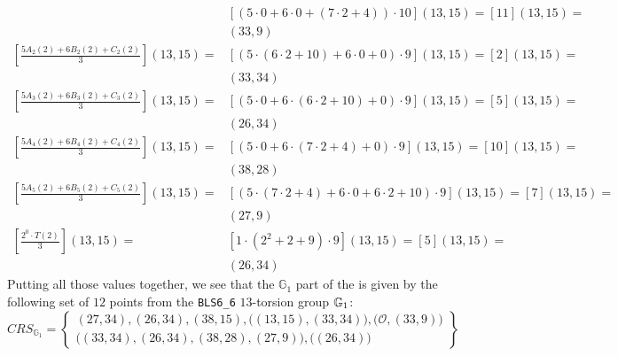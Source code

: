 \begin{example}
\begin{align*}
 & [(5\cdot 0 +6\cdot 0 + (7\cdot 2 + 4))\cdot 10](13,15) = [11](13,15) = \\
 & (33,9) \\
[\frac{5 A_{2}(2)+ 6 B_{2}(2) + C_{2}(2)}{3}](13,15) =
 & [(5\cdot (6\cdot 2 +10) +6\cdot 0 +0 )\cdot 9](13,15) = [2](13,15) = \\
 & (33,34) \\
[\frac{5 A_{3}(2)+ 6 B_{3}(2) + C_{3}(2)}{3}](13,15) =
 & [(5\cdot 0 +6\cdot (6\cdot 2 + 10) + 0 )\cdot 9](13,15) = [5](13,15) = \\
 & (26,34) \\
[\frac{5 A_{4}(2)+ 6 B_{4}(2) + C_{4}(2)}{3}](13,15) = 
 & [(5\cdot 0+6\cdot(7\cdot 2 +4)+0)\cdot 9](13,15) =[10](13,15) = \\
 & (38,28) \\
[\frac{5 A_{5}(2)+ 6 B_{5}(2) + C_{5}(2)}{3}](13,15) =
 & [(5\cdot (7\cdot 2 + 4) +6\cdot 0 + 6\cdot 2 + 10 )\cdot 9](13,15) = [7](13,15) = \\
 & (27,9)\\
[\frac{2^0\cdot T(2)}{3}](13,15) =
 & [1\cdot (2^2+2+9)\cdot 9](13,15)= [5](13,15) = \\
 & (26,34)
\end{align*}
Putting all those values together, we see that the $\mathbb{G}_1$ part of the  is given by the following set of $12$ points from the \texttt{BLS6\_6} $13$-torsion group $\mathbb{G}_1$: 
\begin{equation}
\label{ex:3-fac-groth-16-crs}
CRS_{\mathbb{G}_{1}}=\left\{ \begin{array}{c}
(27,34),(26,34),(38,15),\Big((13,15),(33,34)\Big),
\Big(\mathcal{O}, (33,9)\Big)\\
\Big((33,34),(26,34),(38,28),(27,9)\Big),
\Big((26,34)\Big)
\end{array}\right\}
\end{equation}


\end{example}
